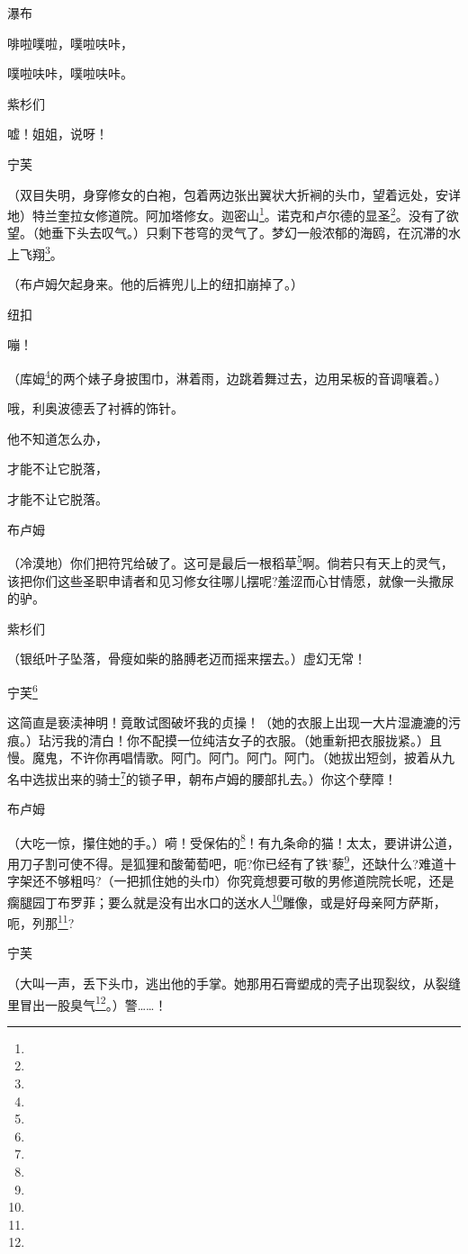 \par 瀑布
\par 啡啦噗啦，噗啦呋咔，
\par 噗啦呋咔，噗啦呋咔。
\par 紫杉们
\par 嘘！姐姐，说呀！
\par 宁芙
\par （双目失明，身穿修女的白袍，包着两边张出翼状大折裥的头巾，望着远处，安详地）特兰奎拉女修道院。阿加塔修女。迦密山\footnote{}。诺克和卢尔德的显圣\footnote{}。没有了欲望。（她垂下头去叹气。）只剩下苍穹的灵气了。梦幻一般浓郁的海鸥，在沉滞的水上飞翔\footnote{}。
\par （布卢姆欠起身来。他的后裤兜儿上的纽扣崩掉了。）
\par 纽扣
\par 嘣！
\par （库姆\footnote{}的两个婊子身披围巾，淋着雨，边跳着舞过去，边用呆板的音调嚷着。）
\par 哦，利奥波德丢了衬裤的饰针。
\par 他不知道怎么办，
\par 才能不让它脱落，
\par 才能不让它脱落。
\par 布卢姆
\par （冷漠地）你们把符咒给破了。这可是最后一根稻草\footnote{}啊。倘若只有天上的灵气，该把你们这些圣职申请者和见习修女往哪儿摆呢?羞涩而心甘情愿，就像一头撒尿的驴。
\par 紫杉们
\par （银纸叶子坠落，骨瘦如柴的胳膊老迈而摇来摆去。）虚幻无常！
\par 宁芙\footnote{}
\par 这简直是亵渎神明！竟敢试图破坏我的贞操！（她的衣服上出现一大片湿漉漉的污痕。）玷污我的清白！你不配摸一位纯洁女子的衣服。（她重新把衣服拢紧。）且慢。魔鬼，不许你再唱情歌。阿门。阿门。阿门。阿门。（她拔出短剑，披着从九名中选拔出来的骑士\footnote{}的锁子甲，朝布卢姆的腰部扎去。）你这个孽障！
\par 布卢姆
\par （大吃一惊，攥住她的手。）嗬！受保佑的\footnote{}！有九条命的猫！太太，要讲讲公道，用刀子割可使不得。是狐狸和酸葡萄吧，呃?你已经有了铁'藜\footnote{}，还缺什么?难道十字架还不够粗吗?（一把抓住她的头巾）你究竟想要可敬的男修道院院长呢，还是瘸腿园丁布罗菲；要么就是没有出水口的送水人\footnote{}雕像，或是好母亲阿方萨斯，呃，列那\footnote{}?
\par 宁芙
\par （大叫一声，丢下头巾，逃出他的手掌。她那用石膏塑成的壳子出现裂纹，从裂缝里冒出一股臭气\footnote{}。）警……！
